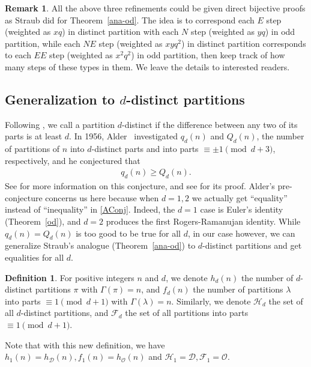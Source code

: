 \documentclass[12pt]{amsart}
\numberwithin{equation}{section}
\theoremstyle{plain}
\theoremstyle{definition}
\newtheorem{Def}[theorem]{Definition}
\newtheorem{remark}[theorem]{Remark}
\def\D{\mathcal{D}}
\def\F{\mathcal{F}}
\def\O{\mathcal{O}}
\def\H{\mathcal{H}}
\begin{document}
\begin{remark}
All the above three refinements could be given direct bijective proofs as Straub did for Theorem~\ref{ana-od}. The idea is to correspond each $E$ step (weighted as $xq$) in distinct partition with each $N$ step (weighted as $yq$) in odd partition, while each $NE$ step (weighted as $xyq^2$) in distinct partition corresponds to each $EE$ step (weighted as $x^2q^2$) in odd partition, then keep track of how many steps of these types in them. We leave the details to interested readers.
\end{remark}



\subsection{Generalization to $d$-distinct partitions}
Following \cite{AE}, we call a partition $d$-distinct if the difference between any two of its parts is at least $d$. In 1956, Alder~\cite{Ald} investigated $q_d(n)$ and $Q_d(n)$, the number of partitions of $n$ into $d$-distinct parts and into parts $\equiv \pm 1\pmod {d+3}$, respectively, and he conjectured that
\begin{align}\label{AConj}
q_d(n)\geq Q_d(n).
\end{align}
See \cite[Chapter 4.3]{AE} for more information on this conjecture, and see \cite{AJO, Andr1, Yee} for its proof. Alder's pre-conjecture concerns us here because when $d=1,2$ we actually get ``equality'' instead of ``inequality'' in \eqref{AConj}. Indeed, the $d=1$ case is Euler's identity (Theorem~\ref{od}), and $d=2$ produces the first Rogers-Ramanujan identity. While $q_d(n)=Q_d(n)$ is too good to be true for all $d$, in our case however, we can generalize Straub's analogue (Theorem~\ref{ana-od}) to $d$-distinct partitions and get equalities for all $d$.
\begin{Def}
For positive integers $n$ and $d$, we denote $h_d(n)$ the number of $d$-distinct partitions $\pi$ with $\Gamma(\pi)=n$, and $f_d(n)$ the number of partitions $\lambda$ into parts $\equiv 1 \pmod {d+1}$ with $\Gamma(\lambda)=n$. Similarly, we denote $\H_d$ the set of all $d$-distinct partitions, and $\F_d$ the set of all partitions into parts $\equiv 1 \pmod{d+1}$.
\end{Def}
Note that with this new definition, we have $h_1(n)=h_{\D}(n), f_1(n)=h_{\O}(n)$ and $\H_1=\D,\F_1=\O$.
\end{document}

